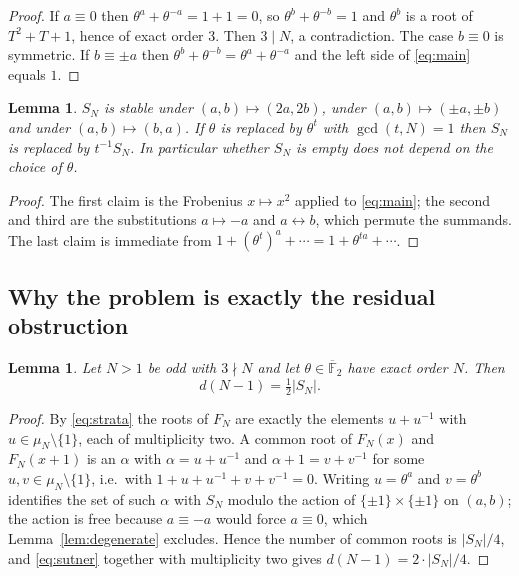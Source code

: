 \documentclass[a4paper]{article}
\newtheorem{lemma}[theorem]{Lemma}
\newcommand{\F}{\mathbb{F}}
\newcommand{\abs}[1]{\left|#1\right|}
\begin{document}
\begin{proof}
	If $a\equiv0$ then $\theta^a+\theta^{-a}=1+1=0$, so
	$\theta^b+\theta^{-b}=1$ and $\theta^{b}$ is a root of $T^2+T+1$,
	hence of exact order $3$.
	Then $3\mid N$, a contradiction.
	The case $b\equiv0$ is symmetric.
	If $b\equiv\pm a$ then $\theta^{b}+\theta^{-b}=\theta^{a}+\theta^{-a}$
	and the left side of \eqref{eq:main} equals $1$.
\end{proof}

\begin{lemma}\label{lem:symmetry}
	$S_{N}$ is stable under $(a,b)\mapsto(2a,2b)$, under
	$(a,b)\mapsto(\pm a,\pm b)$ and under $(a,b)\mapsto(b,a)$.
	If $\theta$ is replaced by $\theta^{t}$ with $\gcd(t,N)=1$ then
	$S_{N}$ is replaced by $t^{-1}S_{N}$.
	In particular whether $S_{N}$ is empty does not depend on the choice of
	$\theta$.
\end{lemma}

\begin{proof}
	The first claim is the Frobenius $x\mapsto x^2$ applied to
	\eqref{eq:main}; the second and third are the substitutions
	$a\mapsto-a$ and $a\leftrightarrow b$, which permute the summands.
	The last claim is immediate from
	$1+(\theta^{t})^{a}+\cdots=1+\theta^{ta}+\cdots$.
\end{proof}

\subsection{Why the problem is exactly the residual obstruction}

\begin{lemma}\label{lem:d-count}
	Let $N>1$ be odd with $3\nmid N$ and let $\theta\in\overline{\F}_2$
	have exact order $N$.
	Then
	\[
		d(N-1)=\tfrac12\abs{S_N}.
	\]
\end{lemma}

\begin{proof}
	By \eqref{eq:strata} the roots of $F_N$ are exactly the elements
	$u+u^{-1}$ with $u\in\mu_N\setminus\{1\}$, each of multiplicity two.
	A common root of $F_N(x)$ and $F_N(x+1)$ is an $\alpha$ with
	$\alpha=u+u^{-1}$ and $\alpha+1=v+v^{-1}$ for some
	$u,v\in\mu_N\setminus\{1\}$, i.e.\ with
	$1+u+u^{-1}+v+v^{-1}=0$.
	Writing $u=\theta^a$ and $v=\theta^b$ identifies the set of such
	$\alpha$ with $S_N$ modulo the action of
	$\{\pm1\}\times\{\pm1\}$ on $(a,b)$; the action is free because
	$a\equiv-a$ would force $a\equiv0$, which Lemma~\ref{lem:degenerate}
	excludes.
	Hence the number of common roots is $\abs{S_N}/4$, and
	\eqref{eq:sutner} together with multiplicity two gives
	$d(N-1)=2\cdot\abs{S_N}/4$.
\end{proof}
\end{document}
